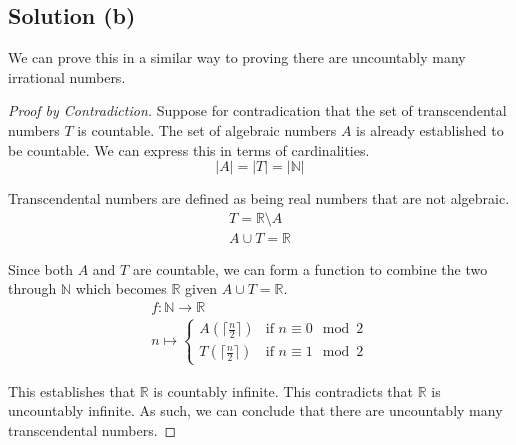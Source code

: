\documentclass[12pt]{report}
\begin{document}
\subsection{Solution (b)}
We can prove this in a similar way to proving there are uncountably many irrational numbers.
\begin{proof}[Proof by Contradiction]
    Suppose for contradication that the set of transcendental numbers $T$ is countable.
    The set of algebraic numbers $A$ is already established to be countable.
    We can express this in terms of cardinalities.
    \begin{equation}
        |A| = |T| = |\mathbb{N}|
    \end{equation}

    Transcendental numbers are defined as being real numbers that are not algebraic.
    \begin{gather}
        T = \mathbb{R} \setminus A\\
        A \cup T = \mathbb{R}
    \end{gather}

    Since both $A$ and $T$ are countable, we can form a function to combine the two through $\mathbb{N}$ which becomes $\mathbb{R}$ given $A \cup T = \mathbb{R}$.
    \begin{gather}
        f: \mathbb{N} \to \mathbb{R}\\
        n \mapsto \begin{cases}
            A(\lceil\frac{n}{2}\rceil) &\text{if } n \equiv 0 \mod 2\\
            T(\lceil\frac{n}{2}\rceil) &\text{if } n \equiv 1 \mod 2
        \end{cases}
    \end{gather}

    This establishes that $\mathbb{R}$ is countably infinite. 
    This contradicts that $\mathbb{R}$ is uncountably infinite.
    As such, we can conclude that there are uncountably many transcendental numbers.
\end{proof}
\end{document}
